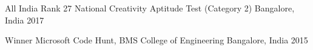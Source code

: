 
\begin{cvhonors}

  \cvhonor
    {All India Rank 27} %
    {National Creativity Aptitude Test (Category 2)} %
    {Bangalore, India} %
    {2017} %

  \cvhonor
    {Winner} %
    {Microsoft Code Hunt, BMS College of Engineering} %
    {Bangalore, India} %
    {2015} %

\end{cvhonors}

